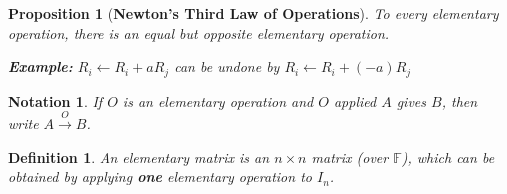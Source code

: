 \documentclass[12pt]{article}
\theoremstyle{plain}
\newtheorem{definition}{Definition}[subsection]
\newtheorem{proposition}{Proposition}[subsection]
\newtheorem{notation}{Notation}[subsection]
\newcommand{\mF}{{\mathbb{F}}}
\begin{document}
	\begin{proposition}[\textbf{Newton's Third Law of Operations}]
		To every elementary operation, there is an equal but opposite 
		elementary operation. 
	
		{\color{Brown}
		\textbf{Example: } $R_i \leftarrow R_i + aR_j$
		can be undone by $R_i \leftarrow R_i + (-a)R_j$\\
		}
	\end{proposition}

	\begin{notation}
		If $O$ is an elementary operation and $O$ applied
		$A$ gives $B$, then write $A \overset{O}{\longrightarrow} B$. 
	\end{notation}

	\begin{definition}
		An elementary matrix is an $n\times n$ matrix (over $\mF$), which can 
		be obtained by applying \textbf{one} elementary operation to $I_n$. 
	\end{definition}
\end{document}
